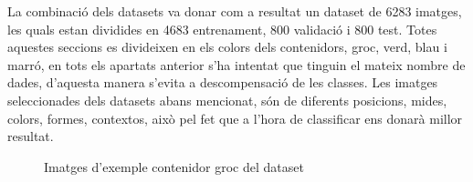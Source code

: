 ﻿\documentclass[10pt,a4paper,twocolumn,twoside]{article}
\begin{document}
La combinació dels datasets va donar com a resultat un dataset de 6283 imatges, les quals estan dividides en 4683 entrenament, 800 validació i 800 test. Totes aquestes seccions es divideixen en els colors dels contenidors, groc, verd, blau i marró, en tots els apartats anterior s'ha intentat que tinguin el mateix nombre de dades, d'aquesta manera s'evita a descompensació de les classes. Les imatges seleccionades dels datasets abans mencionat, són de diferents posicions, mides, colors, formes, contextos, això pel fet que a l'hora de classificar ens donarà millor resultat. 

\begin{figure} [h]
\footnotesize
{}
\caption{Imatges d'exemple contenidor groc del dataset}
\end{figure}
\end{document}
